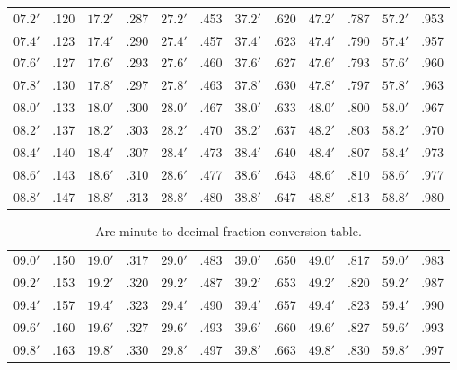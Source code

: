 \begin{table}[!h]
{\begin{tabular}{ll|ll|ll|ll|ll|ll}
$07.2'$ & .120 & $17.2'$ & .287 & $27.2'$ & .453 & $37.2'$ & .620 & $47.2'$ & .787 & $57.2'$ & .953\\
$07.4'$ & .123 & $17.4'$ & .290 & $27.4'$ & .457 & $37.4'$ & .623 & $47.4'$ & .790 & $57.4'$ & .957\\
$07.6'$ & .127 & $17.6'$ & .293 & $27.6'$ & .460 & $37.6'$ & .627 & $47.6'$ & .793 & $57.6'$ & .960\\
$07.8'$ & .130 & $17.8'$ & .297 & $27.8'$ & .463 & $37.8'$ & .630 & $47.8'$ & .797 & $57.8'$ & .963\\
$08.0'$ & .133 & $18.0'$ & .300 & $28.0'$ & .467 & $38.0'$ & .633 & $48.0'$ & .800 & $58.0'$ & .967\\
$08.2'$ & .137 & $18.2'$ & .303 & $28.2'$ & .470 & $38.2'$ & .637 & $48.2'$ & .803 & $58.2'$ & .970\\
$08.4'$ & .140 & $18.4'$ & .307 & $28.4'$ & .473 & $38.4'$ & .640 & $48.4'$ & .807 & $58.4'$ & .973\\
$08.6'$ & .143 & $18.6'$ & .310 & $28.6'$ & .477 & $38.6'$ & .643 & $48.6'$ & .810 & $58.6'$ & .977\\
$08.8'$ & .147 & $18.8'$ & .313 & $28.8'$ & .480 & $38.8'$ & .647 & $48.8'$ & .813 & $58.8'$ & .980\\
\end{tabular}}
\end{table}

\clearpage
\begin{table}[!h]
\vspace{0.25cm}
\centering
{\small\begin{tabular}{ll|ll|ll|ll|ll|ll}
$09.0'$ & .150 & $19.0'$ & .317 & $29.0'$ & .483 & $39.0'$ & .650 & $49.0'$ & .817 & $59.0'$ & .983\\
$09.2'$ & .153 & $19.2'$ & .320 & $29.2'$ & .487 & $39.2'$ & .653 & $49.2'$ & .820 & $59.2'$ & .987\\
$09.4'$ & .157 & $19.4'$ & .323 & $29.4'$ & .490 & $39.4'$ & .657 & $49.4'$ & .823 & $59.4'$ & .990\\
$09.6'$ & .160 & $19.6'$ & .327 & $29.6'$ & .493 & $39.6'$ & .660 & $49.6'$ & .827 & $59.6'$ & .993\\
$09.8'$ & .163 & $19.8'$ & .330 & $29.8'$ & .497 & $39.8'$ & .663 & $49.8'$ & .830 & $59.8'$ & .997\\
\end{tabular}}
\caption{Arc minute to decimal fraction conversion table.}\label{lt6a}
\end{table}

